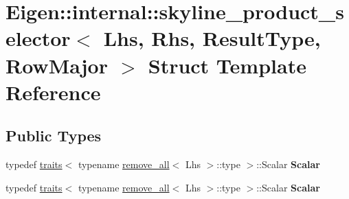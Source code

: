 \hypertarget{struct_eigen_1_1internal_1_1skyline__product__selector_3_01_lhs_00_01_rhs_00_01_result_type_00_01_row_major_01_4}{}\section{Eigen\+:\+:internal\+:\+:skyline\+\_\+product\+\_\+selector$<$ Lhs, Rhs, Result\+Type, Row\+Major $>$ Struct Template Reference}
\label{struct_eigen_1_1internal_1_1skyline__product__selector_3_01_lhs_00_01_rhs_00_01_result_type_00_01_row_major_01_4}
\subsection*{Public Types}
\begin{DoxyCompactItemize}
\item 
\mbox{\label{struct_eigen_1_1internal_1_1skyline__product__selector_3_01_lhs_00_01_rhs_00_01_result_type_00_01_row_major_01_4_a921b8f22f16be7fbe252bd91c3b1159d}} 
typedef \hyperlink{struct_eigen_1_1internal_1_1traits}{traits}$<$ typename \hyperlink{struct_eigen_1_1internal_1_1remove__all}{remove\+\_\+all}$<$ Lhs $>$\+::type $>$\+::Scalar {\bfseries Scalar}
\item 
\mbox{\label{struct_eigen_1_1internal_1_1skyline__product__selector_3_01_lhs_00_01_rhs_00_01_result_type_00_01_row_major_01_4_a921b8f22f16be7fbe252bd91c3b1159d}} 
typedef \hyperlink{struct_eigen_1_1internal_1_1traits}{traits}$<$ typename \hyperlink{struct_eigen_1_1internal_1_1remove__all}{remove\+\_\+all}$<$ Lhs $>$\+::type $>$\+::Scalar {\bfseries Scalar}
\end{DoxyCompactItemize}
